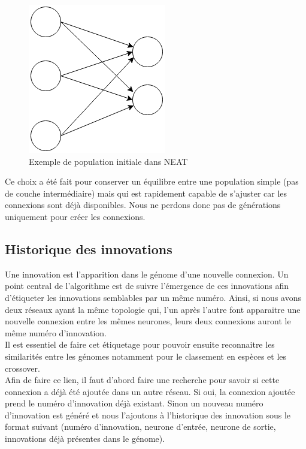 \documentclass{article}
\begin{document}
\begin{figure}[H]
\begin{center}
	\includegraphics[scale=0.6]{initneat.png}
	\caption{Exemple de population initiale dans NEAT}
\end{center}
\end{figure}

Ce choix a été fait pour conserver un équilibre entre une population simple (pas de couche intermédiaire) mais qui est rapidement capable de s'ajuster car les connexions sont déjà disponibles. Nous ne perdons donc pas de générations uniquement pour créer les connexions.

\subsection{Historique des innovations}

Une innovation est l'apparition dans le génome d'une nouvelle connexion. Un point central de l'algorithme est de suivre l'émergence de ces innovations afin d'étiqueter les innovations semblables par un même numéro. Ainsi, si nous avons deux réseaux ayant la même topologie qui, l'un après l'autre font apparaitre une nouvelle connexion entre les mêmes neurones, leurs deux connexions auront le même numéro d'innovation.\\

Il est essentiel de faire cet étiquetage pour pouvoir ensuite reconnaitre les similarités entre les génomes notamment pour le classement en espèces et les crossover.\\
	
Afin de faire ce lien, il faut d'abord faire une recherche pour savoir si cette connexion a déjà été ajoutée dans un autre réseau. Si oui, la connexion ajoutée prend le numéro d'innovation déjà existant. Sinon un nouveau numéro d'innovation est généré et nous l'ajoutons à l'historique des innovation sous le format suivant (numéro d'innovation, neurone d'entrée, neurone de sortie, innovations déjà présentes dans le génome).\\
\end{document}
